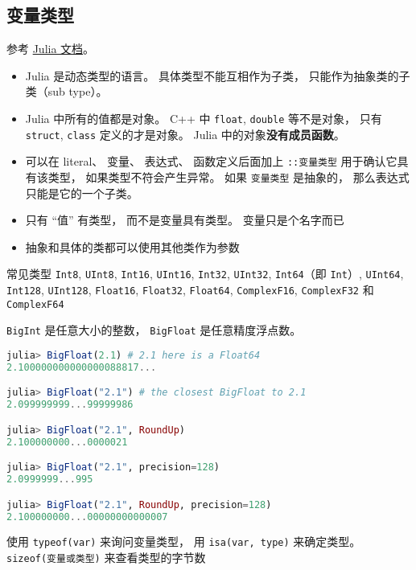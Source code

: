 
\begin{issues}
\issueDraft
\end{issues}

\subsection{变量类型}

参考 \href{https://docs.julialang.org/en/v1/manual/types/#man-declared-types}{Julia 文档}。
\begin{itemize}
\item Julia 是动态类型的语言。 具体类型不能互相作为子类， 只能作为抽象类的子类（sub type）。
\item Julia 中所有的值都是对象。 C++ 中 \verb|float|, \verb|double| 等不是对象， 只有 \verb|struct|, \verb|class| 定义的才是对象。 Julia 中的对象\textbf{没有成员函数}。
\item 可以在 literal、 变量、 表达式、 函数定义后面加上 \verb|::变量类型| 用于确认它具有该类型， 如果类型不符会产生异常。 如果 \verb|变量类型| 是抽象的， 那么表达式只能是它的一个子类。
\item 只有 “值” 有类型， 而不是变量具有类型。 变量只是个名字而已
\item 抽象和具体的类都可以使用其他类作为参数
\end{itemize}

常见类型
\verb|Int8|, \verb|UInt8|, \verb|Int16|, \verb|UInt16|, \verb|Int32|, \verb|UInt32|, \verb|Int64|（即 \verb|Int|）, \verb|UInt64|, \verb|Int128|, \verb|UInt128|, \verb|Float16|, \verb|Float32|, \verb|Float64|, \verb|ComplexF16|, \verb|ComplexF32| 和 \verb|ComplexF64|

\verb|BigInt| 是任意大小的整数， \verb|BigFloat| 是任意精度浮点数。

\begin{lstlisting}[language=julia]
julia> BigFloat(2.1) # 2.1 here is a Float64
2.100000000000000088817...

julia> BigFloat("2.1") # the closest BigFloat to 2.1
2.099999999...99999986

julia> BigFloat("2.1", RoundUp)
2.100000000...0000021

julia> BigFloat("2.1", precision=128)
2.0999999...995

julia> BigFloat("2.1", RoundUp, precision=128)
2.100000000...00000000000007
\end{lstlisting}

使用 \verb|typeof(var)| 来询问变量类型， 用 \verb|isa(var, type)| 来确定类型。 \verb|sizeof(变量或类型)| 来查看类型的字节数

